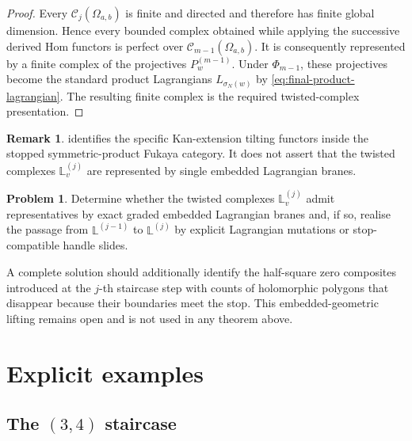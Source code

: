 \documentclass[12pt,a4paper,english,reqno]{amsart}
\theoremstyle{plain}
\theoremstyle{definition}
\newtheorem{remark}[theorem]{Remark}
\newtheorem{Prob}[theorem]{Problem}
\newcommand{\C}{\mathcal C}
\begin{document}
\begin{proof}
Every $\C_j(\Omega_{a,b})$ is finite and directed and therefore has finite
global dimension.  Hence every bounded complex obtained while applying the
successive derived Hom functors is perfect over
$\C_{m-1}(\Omega_{a,b})$.  It is consequently represented by a finite
complex of the projectives $P_w^{(m-1)}$.  Under $\Phi_{m-1}$, these
projectives become the standard product Lagrangians
$L_{\sigma_N(w)}$ by \eqref{eq:final-product-lagrangian}.  The resulting
finite complex is the required twisted-complex presentation.
\end{proof}

\begin{remark}
\label{rem:categorical-versus-geometric}
 identifies the specific
Kan-extension tilting functors inside the stopped symmetric-product Fukaya
category.  It does not assert that the twisted complexes
$\mathbb L_v^{(j)}$ are represented by single embedded Lagrangian branes.
\end{remark}

\begin{Prob}
Determine whether the twisted complexes
$\mathbb L_v^{(j)}$ admit representatives by exact graded embedded
Lagrangian branes and, if so, realise the passage from
$\mathbb L^{(j-1)}$ to $\mathbb L^{(j)}$ by explicit Lagrangian
mutations or stop-compatible handle slides.
\end{Prob}

A complete solution should additionally identify the half-square zero
composites introduced at the $j$-th staircase step with counts of
holomorphic polygons that disappear because their boundaries meet the stop.
This embedded-geometric lifting remains open and is not used in any theorem
above.


\section{Explicit examples}
\label{sec:examples}

\subsection{The \texorpdfstring{$(3,4)$}{(3,4)} staircase}
\end{document}
